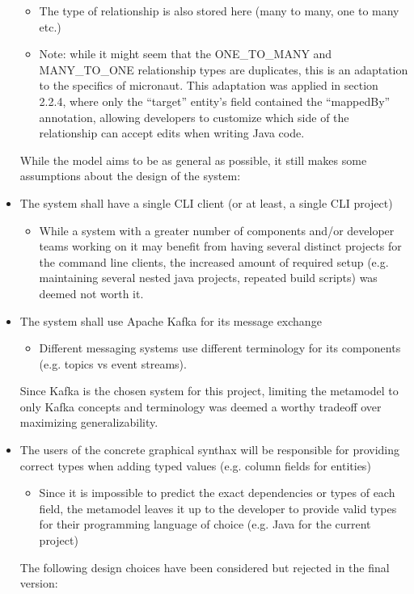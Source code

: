 \documentclass[parskip=full]{article}
\begin{document}
\begin{itemize}
\begin{itemize}
        \item The type of relationship is also stored here (many to many, one to many etc.)
        \item Note:  while it might seem that the ONE\_TO\_MANY and MANY\_TO\_ONE relationship types are duplicates, this is an adaptation to the specifics of micronaut.
        This adaptation was applied in section 2.2.4, where only the ``target'' entity's field contained the ``mappedBy'' annotation, allowing developers to customize which side of the relationship can accept edits when writing Java code.
        \end{itemize}
        While the model aims to be as general as possible, it still makes some assumptions about the design of the system:
        \item	The system shall have a single CLI client (or at least, a single CLI project)
        \begin{itemize}
        \item While a system with a greater number of components and/or developer teams working on it may benefit from having several distinct projects for the command line clients, the increased amount of required setup (e.g. maintaining several nested java projects, repeated build scripts) was deemed not worth it.
        \end{itemize}
        \item	The system shall use Apache Kafka for its message exchange
        \begin{itemize}
        \item Different messaging systems use different terminology for its components (e.g. topics vs event streams).
        \end{itemize}
        Since Kafka is the chosen system for this project, limiting the metamodel to only Kafka concepts and terminology was deemed a worthy tradeoff over maximizing generalizability.
        \item	The users of the concrete graphical synthax will be responsible for providing correct types when adding typed values (e.g. column fields for entities)
        \begin{itemize}
        \item Since it is impossible to predict the exact dependencies or types of each field, the metamodel leaves it up to the developer to provide valid types for their programming language of choice (e.g. Java for the current project)
        \end{itemize}
        The following design choices have been considered but rejected in the final version:

\end{itemize}
\end{document}
